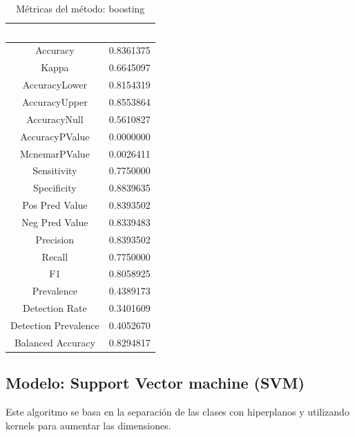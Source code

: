 \begin{table}[!h]
	
	\caption{\label{tab:metricas_boosting}Métricas del método: boosting }
	\centering
	\begin{tabular}[t]{cc}
		\toprule
		\rowcolor{black}  \multicolumn{1}{c}{\textcolor{white}{\textbf{metricas}}} & \multicolumn{1}{c}{\textcolor{white}{\textbf{valor}}}\\
		\midrule
		\rowcolor{gray!6}  Accuracy & 0.8361375\\
		Kappa & 0.6645097\\
		\rowcolor{gray!6}  AccuracyLower & 0.8154319\\
		AccuracyUpper & 0.8553864\\
		\rowcolor{gray!6}  AccuracyNull & 0.5610827\\
		\addlinespace
		AccuracyPValue & 0.0000000\\
		\rowcolor{gray!6}  McnemarPValue & 0.0026411\\
		Sensitivity & 0.7750000\\
		\rowcolor{gray!6}  Specificity & 0.8839635\\
		Pos Pred Value & 0.8393502\\
		\addlinespace
		\rowcolor{gray!6}  Neg Pred Value & 0.8339483\\
		Precision & 0.8393502\\
		\rowcolor{gray!6}  Recall & 0.7750000\\
		F1 & 0.8058925\\
		\rowcolor{gray!6}  Prevalence & 0.4389173\\
		\addlinespace
		Detection Rate & 0.3401609\\
		\rowcolor{gray!6}  Detection Prevalence & 0.4052670\\
		Balanced Accuracy & 0.8294817\\
		\bottomrule
	\end{tabular}
\end{table}



\subsection{Modelo: Support Vector machine (SVM)}

Este algoritmo se basa en la separación de las clases con hiperplanos y
utilizando kernels para aumentar las dimensiones.

